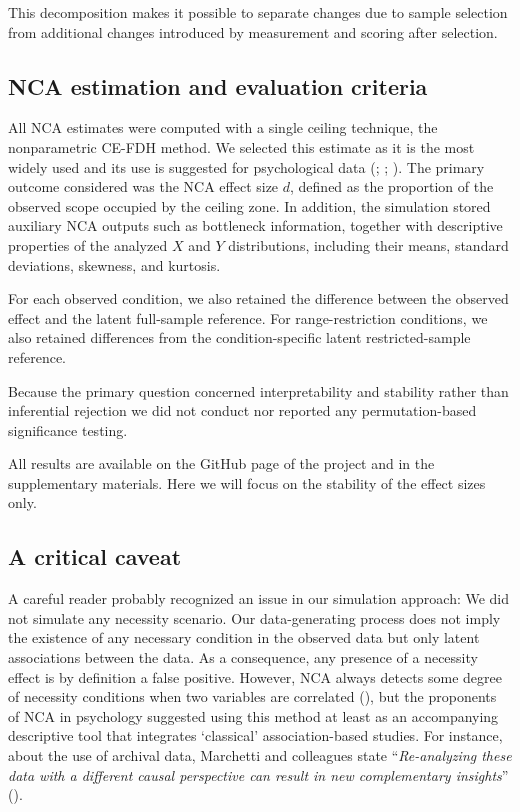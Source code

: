 \documentclass[
  man,
  longtable,
  nolmodern,
  notxfonts,
  notimes,
  colorlinks=true,linkcolor=blue,citecolor=blue,urlcolor=blue]{apa7}
\begin{document}
This decomposition makes it possible to separate changes due to sample
selection from additional changes introduced by measurement and scoring
after selection.

\subsection{NCA estimation and evaluation
criteria}\label{nca-estimation-and-evaluation-criteria}

All NCA estimates were computed with a single ceiling technique, the
nonparametric CE-FDH method. We selected this estimate as it is the most
widely used and its use is suggested for psychological data
(;
;
). The primary outcome considered was the NCA effect size \(d\),
defined as the proportion of the observed scope occupied by the ceiling
zone. In addition, the simulation stored auxiliary NCA outputs such as
bottleneck information, together with descriptive properties of the
analyzed \(X\) and \(Y\) distributions, including their means, standard
deviations, skewness, and kurtosis.

For each observed condition, we also retained the difference between the
observed effect and the latent full-sample reference. For
range-restriction conditions, we also retained differences from the
condition-specific latent restricted-sample reference.

Because the primary question concerned interpretability and stability
rather than inferential rejection we did not conduct nor reported any
permutation-based significance testing.

All results are available on the GitHub page of the project and in the
supplementary materials. Here we will focus on the stability of the
effect sizes only.

\subsection{A critical caveat}\label{a-critical-caveat}

A careful reader probably recognized an issue in our simulation
approach: We did not simulate any necessity scenario. Our
data-generating process does not imply the existence of any necessary
condition in the observed data but only latent associations between the
data. As a consequence, any presence of a necessity effect is by
definition a false positive. However, NCA always detects some degree of
necessity conditions when two variables are correlated
(), but the proponents of NCA in psychology suggested using
this method at least as an accompanying descriptive tool that integrates
`classical' association-based studies. For instance, about the use of
archival data, Marchetti and colleagues state ``\emph{Re-analyzing these
data with a different causal perspective can result in new complementary
insights}''
().
\end{document}
